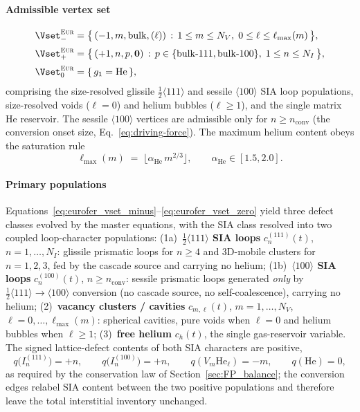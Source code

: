 \paragraph{Admissible vertex set}
\begin{align}
   \Vset_{-}^{\textsc{Eur}}
   &= \bigl\{\,(-1,m,\mathrm{bulk},(\ell))\,:\,
              1\leq m\leq N_V,\;0\leq\ell\leq\ell_{\max}(m)\,\bigr\},
   \label{eq:eurofer_vset_minus}\\[2pt]
   \Vset_{+}^{\textsc{Eur}}
   &= \bigl\{\,(+1,n,p,\mathbf{0})\,:\,
              p\in\{\mathrm{bulk\text{-}111},\mathrm{bulk\text{-}100}\},\;1\leq n\leq N_I\,\bigr\},
   \label{eq:eurofer_vset_plus}\\[2pt]
   \Vset_{0}^{\textsc{Eur}}
   &= \{\,g_1=\mathrm{He}\,\},
   \label{eq:eurofer_vset_zero}
\end{align}
comprising the size-resolved glissile $\tfrac{1}{2}\langle 111\rangle$ and
sessile $\langle 100\rangle$ SIA loop populations, size-resolved voids
($\ell=0$) and helium bubbles ($\ell\geq 1$), and the single matrix He
reservoir. The sessile $\langle 100\rangle$ vertices are admissible only for
$n\geq n_{\mathrm{conv}}$ (the conversion onset size, Eq.~\eqref{eq:driving-force}).
The maximum helium content obeys the saturation rule
\begin{equation}
   \ell_{\max}(m) \;=\; \bigl\lfloor \alpha_{\mathrm{He}}\,m^{2/3}\bigr\rfloor,
   \qquad \alpha_{\mathrm{He}} \in [1.5,2.0].
   \label{eq:ellmax_eurofer}
\end{equation}

\paragraph{Primary populations}
Equations~\eqref{eq:eurofer_vset_minus}--\eqref{eq:eurofer_vset_zero}
yield three defect classes evolved by the master equations, with the SIA class
resolved into two coupled loop-character populations:
(1a)~\textbf{$\tfrac{1}{2}\langle 111\rangle$ SIA loops} $c^{(111)}_n(t)$,
$n=1,\ldots,N_I$: glissile prismatic loops for $n\geq 4$ and 3D-mobile clusters
for $n=1,2,3$, fed by the cascade source and carrying no helium;
(1b)~\textbf{$\langle 100\rangle$ SIA loops} $c^{(100)}_n(t)$,
$n\geq n_{\mathrm{conv}}$: sessile prismatic loops generated \emph{only} by
$\tfrac{1}{2}\langle 111\rangle\!\to\!\langle 100\rangle$ conversion (no cascade
source, no self-coalescence), carrying no helium;
(2)~\textbf{vacancy clusters / cavities} $c_{m,\ell}(t)$,
$m=1,\ldots,N_V$, $\ell=0,\ldots,\ell_{\max}(m)$: spherical cavities, pure
voids when $\ell=0$ and helium bubbles when $\ell\geq 1$;
(3)~\textbf{free helium} $c_h(t)$, the single gas-reservoir variable.
The signed lattice-defect contents of both SIA characters are positive,
\begin{equation}
   q\bigl(I^{(111)}_n\bigr) = +n,
   \qquad
   q\bigl(I^{(100)}_n\bigr) = +n,
   \qquad
   q(V_m\mathrm{He}_\ell) = -m,
   \qquad
   q(\mathrm{He}) = 0,
   \label{eq:q_eurofer}
\end{equation}
as required by the conservation law of Section~\ref{sec:FP_balance}; the
conversion edges relabel SIA content between the two positive populations and
therefore leave the total interstitial inventory unchanged.

